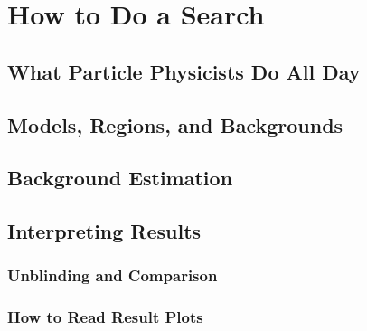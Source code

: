 \chapter{How to Do a Search}

\section{What Particle Physicists Do All Day}

\section{Models, Regions, and Backgrounds}\label{sec:background}

\section{Background Estimation}

\section{Interpreting Results}

\subsection{Unblinding and Comparison}

\subsection{How to Read Result Plots}